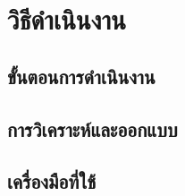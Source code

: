 \chapter{วิธีดำเนินงาน}
\section{ขั้นตอนการดำเนินงาน}
\BlankBody
\section{การวิเคราะห์และออกแบบ}
\begin{figure}[H]
  \centering
  \fbox{\rule{0pt}{4cm}\rule{0.85\linewidth}{0pt}}
  \caption{\BlankField[5cm]}
  \label{fig:template}
\end{figure}
\section{เครื่องมือที่ใช้}
\BlankBody
